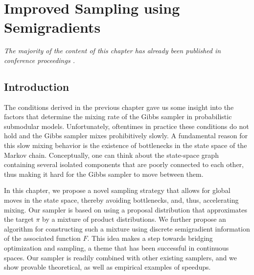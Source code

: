 \chapter{Improved Sampling using Semigradients} \label{ch:m3}

\emph{The majority of the content of this chapter has already been published in conference proceedings \citep{gotovos18}.}

\section{Introduction}
The conditions derived in the previous chapter gave us some insight into the factors that determine the mixing rate of the Gibbs sampler in probabilistic submodular models.
Unfortunately, oftentimes in practice these conditions do not hold and the Gibbs sampler mixes prohibitively slowly.
A fundamental reason for this slow mixing behavior is the existence of bottlenecks in the state space of the Markov chain.
Conceptually, one can think about the state-space graph containing several isolated components that are poorly connected to each other, thus making it hard for the Gibbs sampler to move between them.

In this chapter, we propose a novel sampling strategy that allows for global moves in the state space, thereby avoiding bottlenecks, and, thus, accelerating mixing.
Our sampler is based on using a proposal distribution that approximates the target $\pi$ by a mixture of product distributions.
We further propose an algorithm for constructing such a mixture using discrete semigradient information of the associated function $F$.
This idea makes a step towards bridging optimization and sampling, a theme that has been successful in continuous spaces.
Our sampler is readily combined with other existing samplers, and we show provable theoretical, as well as empirical examples of speedups.


